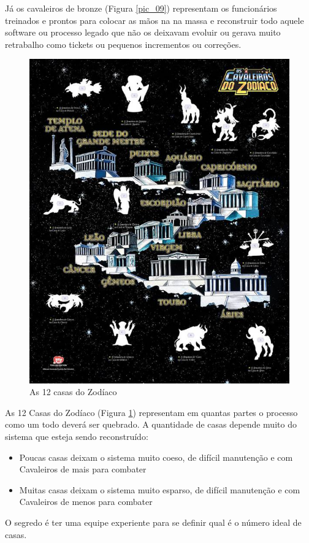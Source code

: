 Já os cavaleiros de bronze (Figura \ref{pic_09}) representam os funcionários treinados e prontos para colocar as mãos na na massa e reconstruir todo aquele software ou processo legado que não os deixavam evoluir ou gerava muito retrabalho como tickets ou pequenos incrementos ou correções.

\begin{figure}[H]
    \centering
    \includegraphics[scale=0.55,keepaspectratio=true]{images/10.jpg}
    \caption{As 12 casas do Zodíaco}
    \label{pic_10}
\end{figure}

As 12 Casas do Zodíaco (Figura \ref{pic_10}) representam em quantas partes o processo como um todo deverá ser quebrado. A quantidade de casas depende muito do sistema que esteja sendo reconstruído: 
\begin{itemize}
    \item Poucas casas deixam o sistema muito coeso, de difícil manutenção e com Cavaleiros de mais para combater
    \item Muitas casas deixam o sistema muito esparso, de difícil manutenção e com Cavaleiros de menos para combater
\end{itemize}
O segredo é ter uma equipe experiente para se definir qual é o número ideal de casas.

